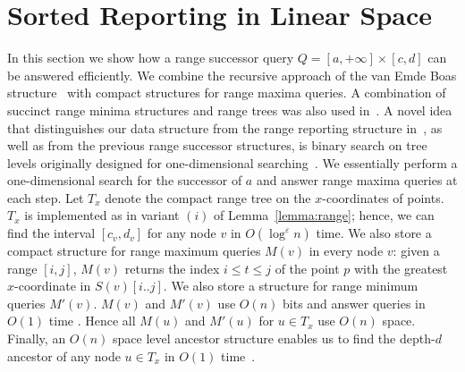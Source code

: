 \documentclass[11pt]{article}
\newcommand{\eps}{\varepsilon}
\begin{document}
\section{Sorted Reporting in Linear Space}
\label{sec:linspace}
In this section we show how a range successor query $Q=[a,+\infty]\times [c,d]$ can be answered efficiently.
We combine the recursive approach of the van Emde Boas
structure~\cite{BoasKZ77} with compact structures for range maxima
queries. A combination of succinct range minima structures 
and range trees was also used in~\cite{ChanLP11}. A novel idea that distinguishes 
our data structure from the range reporting structure in~\cite{ChanLP11}, as well as
 from the previous range successor structures, is binary search on tree levels
 originally designed for one-dimensional searching~\cite{BoasKZ77}.
We essentially perform a  one-dimensional search for the successor 
of $a$ and answer range maxima queries at each step.
 Let $T_x$ denote the compact range tree on the
$x$-coordinates of points. $T_x$ is implemented as in variant $(i)$ of 
Lemma~\ref{lemma:range}; hence, we can find the interval $[c_v,d_v]$
for any node $v$ in $O(\log^{\eps}n)$ time. We also store a
compact structure for range maximum queries $M(v)$ in every node $v$:
given a range $[i,j]$, $M(v)$ returns the index $i\le t\le j$ of the
point $p$ with the greatest $x$-coordinate in $S(v)[i..j]$.
We also store a structure for range minimum  queries $M'(v)$.
$M(v)$ and $M'(v)$ use $O(n)$ bits and answer queries 
in $O(1)$ time \cite{Fis10}. Hence all $M(u)$ and $M'(u)$ for $u\in T_x$ use 
$O(n)$ space. 
Finally, an $O(n)$ space level ancestor structure enables us to 
find the depth-$d$ ancestor of any node $u\in T_x$ in $O(1)$ time~\cite{BenderF04}.
\end{document}
